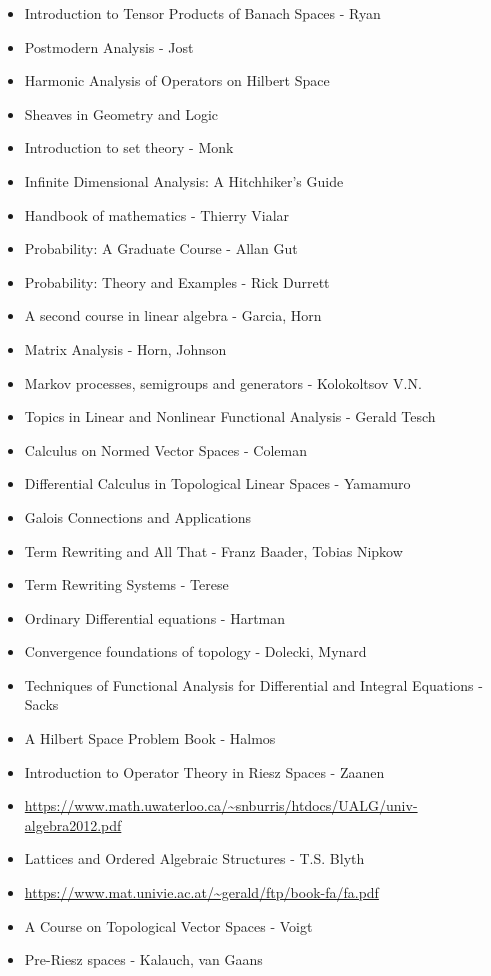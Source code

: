 \documentclass{report}
\begin{document}
\begin{itemize}
\item Introduction to Tensor Products of Banach Spaces - Ryan
\item Postmodern Analysis - Jost
\item Harmonic Analysis of Operators on Hilbert Space
\item Sheaves in Geometry and Logic
\item Introduction to set theory - Monk
\item Infinite Dimensional Analysis: A Hitchhiker’s Guide
\item Handbook of mathematics - Thierry Vialar
\item Probability: A Graduate Course - Allan Gut
\item Probability: Theory and Examples - Rick Durrett
\item A second course in linear algebra - Garcia, Horn
\item Matrix Analysis - Horn, Johnson
\item Markov processes, semigroups and generators - Kolokoltsov V.N.
\item Topics in Linear and Nonlinear Functional Analysis - Gerald Tesch
\item Calculus on Normed Vector Spaces - Coleman
\item Differential Calculus in Topological Linear Spaces - Yamamuro
\item Galois Connections and Applications
\item Term Rewriting and All That - Franz Baader, Tobias Nipkow
\item Term Rewriting Systems - Terese
\item Ordinary Differential equations - Hartman
\item Convergence foundations of topology - Dolecki, Mynard
\item Techniques of Functional Analysis for Differential and Integral Equations - Sacks
\item A Hilbert Space Problem Book - Halmos
\item Introduction to Operator Theory in Riesz Spaces - Zaanen
\item \url{https://www.math.uwaterloo.ca/~snburris/htdocs/UALG/univ-algebra2012.pdf}
\item Lattices and Ordered Algebraic Structures - T.S. Blyth
\item \url{https://www.mat.univie.ac.at/~gerald/ftp/book-fa/fa.pdf}
\item A Course on Topological Vector Spaces - Voigt
\item Pre-Riesz spaces - Kalauch, van Gaans

\end{itemize}
\end{document}

